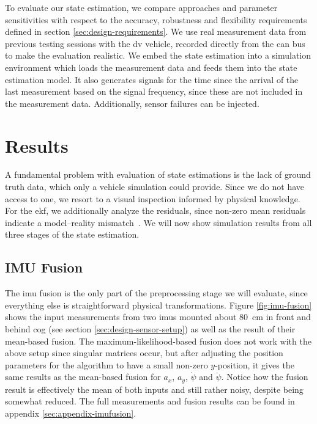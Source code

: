 To evaluate our state estimation, we compare approaches and parameter sensitivities with respect to the accuracy, robustness and flexibility requirements defined in section \ref{sec:design-requirements}. We use real measurement data from previous testing sessions with the \gls{dv} vehicle, recorded directly from the \gls{can} bus to make the evaluation realistic. We embed the state estimation into a simulation environment which loads the measurement data and feeds them into the state estimation model. It also generates signals for the time since the arrival of the last measurement based on the signal frequency, since these are not included in the measurement data. Additionally, sensor failures can be injected.


\section{Results}
A fundamental problem with evaluation of state estimations is the lack of ground truth data, which only a vehicle simulation could provide. Since we do not have access to one, we resort to a visual inspection informed by physical knowledge. For the \gls{ekf}, we additionally analyze the residuals, since non-zero mean residuals indicate a model--reality mismatch~\cite[p.~158]{AlexanderWischnewski.2019}. We will now show simulation results from all three stages of the state estimation.


\subsection{IMU Fusion}
The \gls{imu} fusion is the only part of the preprocessing stage we will evaluate, since everything else is straightforward physical transformations. Figure \ref{fig:imu-fusion} shows the input measurements from two \glspl{imu} mounted about \SI{80}{\centi\meter} in front and behind \gls{cog} (see section \ref{sec:design-sensor-setup}) as well as the result of their mean-based fusion. The maximum-likelihood-based fusion does not work with the above setup since singular matrices occur, but after adjusting the position parameters for the algorithm to have a small non-zero $y$-position, it gives the same results as the mean-based fusion for $a_x$, $a_y$, $\dot{\psi}$ and $\ddot{\psi}$. Notice how the fusion result is effectively the mean of both inputs and still rather noisy, despite being somewhat reduced. The full measurements and fusion results can be found in appendix \ref{sec:appendix-imufusion}.

